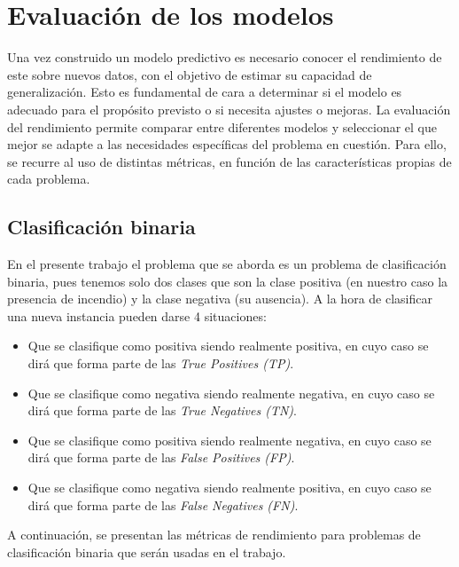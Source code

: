 \documentclass[12pt,a4paper,]{book}
\numberwithin{dummy}{section}
\theoremstyle{ocrenumbox}
\theoremstyle{blacknumex}
\theoremstyle{blacknumbox}
\theoremstyle{ocrenum}
\theoremstyle{ocrenum}
\begin{document}
\hypertarget{evaluaciuxf3n-de-los-modelos}{%
\section{Evaluación de los modelos}\label{evaluaciuxf3n-de-los-modelos}}

Una vez construido un modelo predictivo es necesario conocer el
rendimiento de este sobre nuevos datos, con el objetivo de estimar su
capacidad de generalización. Esto es fundamental de cara a determinar si
el modelo es adecuado para el propósito previsto o si necesita ajustes o
mejoras. La evaluación del rendimiento permite comparar entre diferentes
modelos y seleccionar el que mejor se adapte a las necesidades
específicas del problema en cuestión. Para ello, se recurre al uso de
distintas métricas, en función de las características propias de cada
problema.

\hypertarget{clasificaciuxf3n-binaria}{%
\subsection{Clasificación binaria}\label{clasificaciuxf3n-binaria}}

En el presente trabajo el problema que se aborda es un problema de
clasificación binaria, pues tenemos solo dos clases que son la clase
positiva (en nuestro caso la presencia de incendio) y la clase negativa
(su ausencia). A la hora de clasificar una nueva instancia pueden darse
4 situaciones:

\begin{itemize}
\item
  Que se clasifique como positiva siendo realmente positiva, en cuyo
  caso se dirá que forma parte de las \emph{True Positives (TP)}.
\item
  Que se clasifique como negativa siendo realmente negativa, en cuyo
  caso se dirá que forma parte de las \emph{True Negatives (TN)}.
\item
  Que se clasifique como positiva siendo realmente negativa, en cuyo
  caso se dirá que forma parte de las \emph{False Positives (FP)}.
\item
  Que se clasifique como negativa siendo realmente positiva, en cuyo
  caso se dirá que forma parte de las \emph{False Negatives (FN)}.
\end{itemize}

A continuación, se presentan las métricas de rendimiento para problemas
de clasificación binaria que serán usadas en el trabajo.
\end{document}
